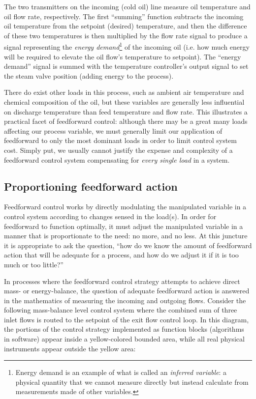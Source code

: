 The two transmitters on the incoming (cold oil) line measure oil temperature and oil flow rate, respectively.  The first ``summing'' function subtracts the incoming oil temperature from the setpoint (desired) temperature, and then the difference of these two temperatures is then multiplied by the flow rate signal to produce a signal representing the \textit{energy demand}\footnote{Energy demand is an example of what is called an \textit{inferred variable}: a physical quantity that we cannot measure directly but instead calculate from measurements made of other variables.} of the incoming oil (i.e. how much energy will be required to elevate the oil flow's temperature to setpoint).  The ``energy demand'' signal is summed with the temperature controller's output signal to set the steam valve position (adding energy to the process).  

There do exist other loads in this process, such as ambient air temperature and chemical composition of the oil, but these variables are generally less influential on discharge temperature than feed temperature and flow rate.  This illustrates a practical facet of feedforward control: although there may be a great many loads affecting our process variable, we must generally limit our application of feedforward to only the most dominant loads in order to limit control system cost.  Simply put, we usually cannot justify the expense and complexity of a feedforward control system compensating for \textit{every single load} in a system.




\filbreak
\subsection{Proportioning feedforward action}

Feedforward control works by directly modulating the manipulated variable in a control system according to changes sensed in the load(s).  In order for feedforward to function optimally, it must adjust the manipulated variable in a manner that is proportionate to the need: no more, and no less.  At this juncture it is appropriate to ask the question, ``how do we know the amount of feedforward action that will be adequate for a process, and how do we adjust it if it is too much or too little?''

In processes where the feedforward control strategy attempts to achieve direct mass- or energy-balance, the question of adequate feedforward action is answered in the mathematics of measuring the incoming and outgoing flows.  Consider the following mass-balance level control system where the combined sum of three inlet flows is routed to the setpoint of the exit flow control loop.  In this diagram, the portions of the control strategy implemented as function blocks (algorithms in software) appear inside a yellow-colored bounded area, while all real physical instruments appear outside the yellow area:

